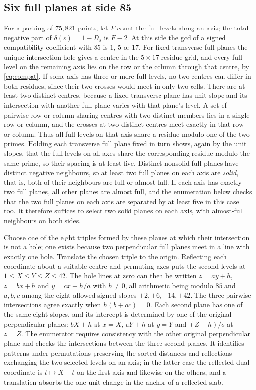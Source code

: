\documentclass[11pt,colorlinks]{charlie}
\begin{document}
\subsection{Six full planes at side 85}\label{sec:enum85}
For a packing of $75{,}821$ points, let $F$ count the full levels along an axis; the total negative part of $\delta(s)=1-D_s$ is $F-2$. At this side the gcd of a signed compatibility coefficient with $85$ is $1$, $5$ or $17$. For fixed transverse full planes the unique intersection hole gives a centre in the $5\times17$ residue grid, and every full level on the remaining axis lies on the row or the column through that centre, by \eqref{eq:compat}. If some axis has three or more full levels, no two centres can differ in both residues, since their two crosses would meet in only two cells. There are at least two distinct centres, because a fixed transverse plane has unit slope and its intersection with another full plane varies with that plane's level. A set of pairwise row-or-column-sharing centres with two distinct members lies in a single row or column, and the crosses at two distinct centres meet exactly in that row or column. Thus all full levels on that axis share a residue modulo one of the two primes. Holding each transverse full plane fixed in turn shows, again by the unit slopes, that the full levels on all axes share the corresponding residue modulo the same prime, so their spacing is at least five. Distinct nonsolid full planes have distinct negative neighbours, so at least two full planes on each axis are \emph{solid}, that is, both of their neighbours are full or almost full. If each axis has exactly two full planes, all other planes are almost full, and the enumeration below checks that the two full planes on each axis are separated by at least five in this case too. It therefore suffices to select two solid planes on each axis, with almost-full neighbours on both sides.

Choose one of the eight triples formed by these planes at which their intersection is not a hole; one exists because two perpendicular full planes meet in a line with exactly one hole. Translate the chosen triple to the origin. Reflecting each coordinate about a suitable centre and permuting axes puts the second levels at $1\le X\le Y\le Z\le42$. The hole lines at zero can then be written $z=ay+h$, $z=bx+h$ and $y=cx-h/a$ with $h\ne0$, all arithmetic being modulo $85$ and $a,b,c$ among the eight allowed signed slopes $\pm2,\pm6,\pm14,\pm42$. The three pairwise intersections agree exactly when $h(b+ac)=0$. Each second plane has one of the same eight slopes, and its intercept is determined by one of the original perpendicular planes: $bX+h$ at $x=X$, $aY+h$ at $y=Y$ and $(Z-h)/a$ at $z=Z$. The enumerator requires consistency with the other original perpendicular plane and checks the intersections between the three second planes. It identifies patterns under permutations preserving the sorted distances and reflections exchanging the two selected levels on an axis; in the latter case the reflected dual coordinate is $t\mapsto X-t$ on the first axis and likewise on the others, and a translation absorbs the one-unit change in the anchor of a reflected slab.
\end{document}
